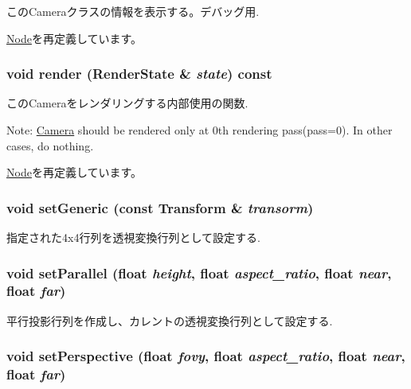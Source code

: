 このCameraクラスの情報を表示する。デバッグ用. 

\hyperlink{classm3g_1_1Node_6fea17fa1532df3794f8cb39cb4f911f}{Node}を再定義しています。\hypertarget{classm3g_1_1Camera_8babc8a79b78615da51161e94029eea9}{
\subsubsection[{render}]{\setlength{\rightskip}{0pt plus 5cm}void render ({\bf RenderState} \& {\em state}) const}}
\label{classm3g_1_1Camera_8babc8a79b78615da51161e94029eea9}


このCameraをレンダリングする内部使用の関数.

Note: \hyperlink{classm3g_1_1Camera}{Camera} should be rendered only at 0th rendering pass(pass=0). In other cases, do nothing. 

\hyperlink{classm3g_1_1Node_8babc8a79b78615da51161e94029eea9}{Node}を再定義しています。\hypertarget{classm3g_1_1Camera_51c42821097e90d3f59e87676684f60a}{
\subsubsection[{setGeneric}]{\setlength{\rightskip}{0pt plus 5cm}void setGeneric (const {\bf Transform} \& {\em transorm})}}
\label{classm3g_1_1Camera_51c42821097e90d3f59e87676684f60a}


指定された4x4行列を透視変換行列として設定する. \hypertarget{classm3g_1_1Camera_cb4535fd75b28b4d58390962d0c0e588}{
\subsubsection[{setParallel}]{\setlength{\rightskip}{0pt plus 5cm}void setParallel (float {\em height}, \/  float {\em aspect\_\-ratio}, \/  float {\em near}, \/  float {\em far})}}
\label{classm3g_1_1Camera_cb4535fd75b28b4d58390962d0c0e588}


平行投影行列を作成し、カレントの透視変換行列として設定する. \hypertarget{classm3g_1_1Camera_ca92a48ebe3424deac8e54c27550189d}{
\subsubsection[{setPerspective}]{\setlength{\rightskip}{0pt plus 5cm}void setPerspective (float {\em fovy}, \/  float {\em aspect\_\-ratio}, \/  float {\em near}, \/  float {\em far})}}
\label{classm3g_1_1Camera_ca92a48ebe3424deac8e54c27550189d}


